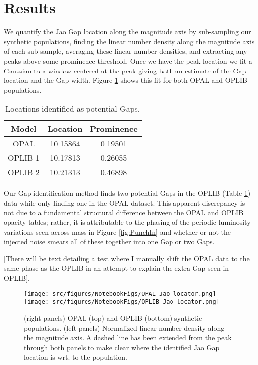\section{Results}\label{sec:results}
We quantify the Jao Gap location along the magnitude axis by sub-sampling
our synthetic populations, finding the linear number density along the
magnitude axis of each sub-sample, averaging these linear number densities, and
extracting any peaks above some prominence threshold. Once we have the peak
location we fit a Gaussian to a window centered at the peak giving both an
estimate of the Gap location and the Gap width. Figure \ref{fig:JaoGapLocator}
shows this fit for both OPAL and OPLIB populations.

\begin{table}
	\centering
	\begin{tabular}{c | c c}
		\hline
		Model & Location & Prominence \\
		\hline
		\hline
		OPAL & 10.15864 & 0.19501 \\
		OPLIB 1 & 10.17813 & 0.26055 \\
		OPLIB 2 & 10.21313 & 0.46898
	\end{tabular}
	\caption{Locations identified as potential Gaps.}
	\label{tab:GapLocation}
\end{table}

Our Gap identification method finds two potential Gaps in the OPLIB (Table
\ref{tab:GapLocation}) data while only finding one in the OPAL dataset. This
apparent discrepancy is not due to a fundamental structural difference between
the OPAL and OPLIB opacity tables; rather, it is attributable to the
phasing of the periodic luminosity variations seen across mass in Figure
\ref{fig:PunchIn} and whether or not the
injected noise smears all of these together into one Gap or two Gaps.

{\color{red} [There will be text detailing a test where I manually shift the
OPAL data to the same phase as the OPLIB in an attempt to explain the extra Gap
seen in OPLIB]}.

\begin{figure}
	\centering
	\texttt{[image: src/figures/NotebookFigs/OPAL\_Jao\_locator.png]}
	\texttt{[image: src/figures/NotebookFigs/OPLIB\_Jao\_locator.png]}
	\caption{(right panels) OPAL (top) and OPLIB (bottom) synthetic
	populations. (left panels) Normalized linear number density along the
	magnitude axis. A dashed line has been extended from the peak through both
	panels to make clear where the identified Jao Gap location is wrt. to the
	population. }
	\label{fig:JaoGapLocator}
\end{figure}

